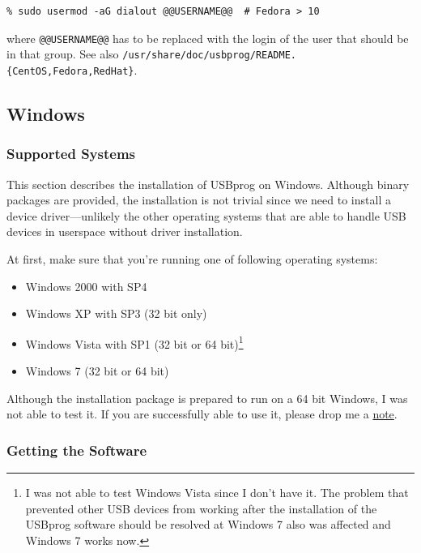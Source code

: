 \documentclass[bibtotoc,UKenglish,halfparskip,oneside,DIV12]{scrreprt}
\begin{document}
\begin{lstlisting}[style=inline]
% sudo usermod -aG uucp @@USERNAME@@     # RHEL 5, CentOS 5
% sudo usermod -aG dialout @@USERNAME@@  # Fedora > 10
\end{lstlisting}

where \texttt{@@USERNAME@@} has to be replaced with the login of the user that should be in that
group.  See also \texttt{/usr/share/doc/usbprog/README.\{CentOS,Fedora,RedHat\}}.

\subsection{Windows}

\subsubsection{Supported Systems}

This section describes the installation of USBprog on Windows. Although binary packages are
provided, the installation is not trivial since we need to install a device driver---unlikely the
other operating systems that are able to handle USB devices in userspace without driver
installation.

At first, make sure that you're running one of following operating systems:

\begin{itemize}
  \item Windows 2000 with SP4
  \item Windows XP with SP3 (32 bit only)
  \item Windows Vista with SP1 (32 bit or 64 bit)\footnote{I was not able to test Windows Vista since
    I don't have it. The problem that prevented other USB devices from working after the
    installation of the USBprog software should be resolved at Windows 7 also was affected and
    Windows 7 works now.}
  \item Windows 7 (32 bit or 64 bit)
\end{itemize}

Although the installation package is prepared to run on a 64 bit Windows, I was not able to test it.
If you are successfully able to use it, please drop me a \href{bernhard@bwalle.de}{note}.

\subsubsection{Getting the Software}
\end{document}
